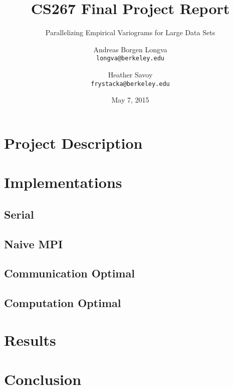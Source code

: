 \documentclass[11pt, oneside]{scrreprt}   	%
\title{CS267 Final Project Report}
\subtitle{Parallelizing Empirical Variograms for Large Data Sets}
\author{Andreas Borgen Longva\\
  \texttt{longva@berkeley.edu}
  \and
  Heather Savoy\\
  \texttt{frystacka@berkeley.edu}}
\date{May 7, 2015}							%
\begin{document}
\maketitle

\section{Project Description}

\section{Implementations}
  \subsection{Serial}
  \subsection{Naive MPI}
  \subsection{Communication Optimal}
  \subsection{Computation Optimal}
\section{Results}

\section{Conclusion}
\end{document}
